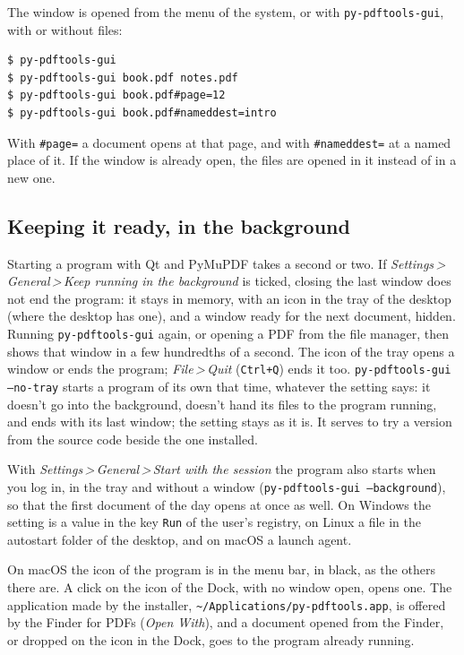 \documentclass[12pt,
              article,
              oneside
              ]{memoir}
\newcommand*{\menu}[1]{\textit{#1}}
\newcommand*{\then}{\,>\,}
\newcommand*{\key}[1]{\texttt{#1}}
\begin{document}
The window is opened from the menu of the system, or with
\texttt{py-pdftools-gui}, with or without files:

\begin{verbatim}
$ py-pdftools-gui
$ py-pdftools-gui book.pdf notes.pdf
$ py-pdftools-gui book.pdf#page=12
$ py-pdftools-gui book.pdf#nameddest=intro
\end{verbatim}

\noindent{}%
With \texttt{\#page=} a document opens at that page, and with
\texttt{\#nameddest=} at a named place of it. If the window is already
open, the files are opened in it instead of in a new one.

\subsection{Keeping it ready, in the background}
\label{sec:background}

%
Starting a program with Qt and PyMuPDF takes a second or two. If
\menu{Settings\then General\then Keep running in the background} is ticked,
closing the last window does not end the program: it stays in memory, with
an icon in the tray of the desktop (where the desktop has one), and a
window ready for the next document, hidden. Running
\texttt{py-pdftools-gui} again, or opening a PDF from the file manager,
then shows that window in a few hundredths of a second. The icon of the
tray opens a window or ends the program; \menu{File\then Quit}
(\key{Ctrl+Q}) ends it too. \texttt{py-pdftools-gui --no-tray} starts a
program of its own that time, whatever the setting says: it doesn't go
into the background, doesn't hand its files to the program running, and
ends with its last window; the setting stays as it is. It serves to try a
version from the source code beside the one installed.

%
With \menu{Settings\then General\then Start with the session} the program
also starts when you log in, in the tray and without a window
(\texttt{py-pdftools-gui --background}), so that the first document of the
day opens at once as well. On Windows the setting is a value in the key
\texttt{Run} of the user's registry, on Linux a file in the autostart
folder of the desktop, and on macOS a launch agent.

%
On macOS the icon of the program is in the menu bar, in black, as the
others there are. A click on the icon of the Dock, with no window open,
opens one. The application made by the installer,
\texttt{\textasciitilde/Applications/py-pdftools.app}, is offered by the
Finder for PDFs (\menu{Open With}), and a document opened from the Finder,
or dropped on the icon in the Dock, goes to the program already running.
\end{document}
